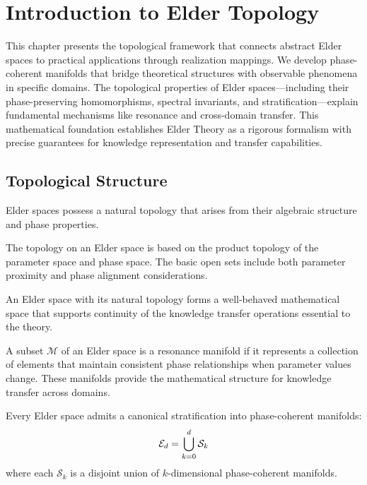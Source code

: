 \chapter{Introduction to Elder Topology}

\begin{chapterabstract}
This chapter presents the topological framework that connects abstract Elder spaces to practical applications through realization mappings. We develop phase-coherent manifolds that bridge theoretical structures with observable phenomena in specific domains. The topological properties of Elder spaces—including their phase-preserving homomorphisms, spectral invariants, and stratification—explain fundamental mechanisms like resonance and cross-domain transfer. This mathematical foundation establishes Elder Theory as a rigorous formalism with precise guarantees for knowledge representation and transfer capabilities.
\end{chapterabstract}

\section{Topological Structure}

Elder spaces possess a natural topology that arises from their algebraic structure and phase properties.

\begin{definition}
The topology on an Elder space is based on the product topology of the parameter space and phase space. The basic open sets include both parameter proximity and phase alignment considerations.
\end{definition}

\begin{theorem}
An Elder space with its natural topology forms a well-behaved mathematical space that supports continuity of the knowledge transfer operations essential to the theory.
\end{theorem}

\begin{definition}
A subset $\mathcal{M}$ of an Elder space is a resonance manifold if it represents a collection of elements that maintain consistent phase relationships when parameter values change. These manifolds provide the mathematical structure for knowledge transfer across domains.
\end{definition}

\begin{theorem}[Stratification]
Every Elder space admits a canonical stratification into phase-coherent manifolds:
\begin{equation}
\mathcal{E}_{d} = \bigcup_{k=0}^{d} \mathcal{S}_k
\end{equation}
where each $\mathcal{S}_k$ is a disjoint union of $k$-dimensional phase-coherent manifolds.
\end{theorem}

